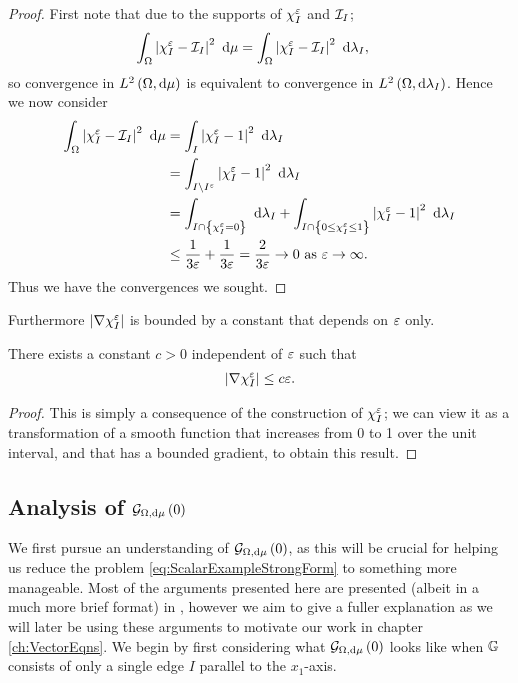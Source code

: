 \begin{proof}
	First note that due to the supports of $\chi_I^\varepsilon$ and $\mathcal{I}_{I}$;
	\begin{align*}
		\int_{\Omega}\left\lvert  \chi_I^\varepsilon - \mathcal{I}_{I}  \right\rvert^2 \ \mathrm{d}\mu
		&= \int_{\Omega}\left\lvert  \chi_I^\varepsilon - \mathcal{I}_{I}  \right\rvert^2 \ \mathrm{d}\lambda_I,
	\end{align*}
	so convergence in $L^{2}\left( \Omega,\mathrm{d}\mu \right)$ is equivalent to convergence in $L^{2}\left( \Omega,\mathrm{d}\lambda_I \right)$.
	Hence we now consider
	\begin{align*}
		\int_{\Omega}\left\lvert  \chi_I^\varepsilon - \mathcal{I}_{I}  \right\rvert^2 \ \mathrm{d}\mu
		&= \int_{I}\left\lvert  \chi_I^\varepsilon - 1  \right\rvert^2 \ \mathrm{d}\lambda_I \\
		&= \int_{I\setminus I^\varepsilon}\left\lvert  \chi_I^\varepsilon - 1  \right\rvert^2 \ \mathrm{d}\lambda_I \\
		&= \int_{I\cap\left\{ \chi_I^\varepsilon = 0 \right\}} \ \mathrm{d}\lambda_I
		+ \int_{I\cap\left\{ 0\leq\chi_I^\varepsilon \leq 1 \right\}}\left\lvert  \chi_I^\varepsilon - 1  \right\rvert^2 \ \mathrm{d}\lambda_I \\
		&\leq \frac{1}{3\varepsilon} + \frac{1}{3\varepsilon} = \frac{2}{3\varepsilon} \rightarrow 0 \ \text{as} \ \varepsilon \rightarrow\infty.
	\end{align*}
	Thus we have the convergences we sought.
\end{proof}
Furthermore $\left\lvert \nabla\chi_I^\varepsilon \right\rvert$ is bounded by a constant that depends on $\varepsilon$ only.
\begin{cory} \label{cory:BoundChiGradient}
	There exists a constant $c>0$ independent of $\varepsilon$ such that
	\begin{align*}
		\left\lvert \nabla\chi_I^\varepsilon \right\rvert \leq c\varepsilon.
	\end{align*}
\end{cory}
\begin{proof}
	This is simply a consequence of the construction of $\chi_I^\varepsilon$; we can view it as a transformation of a smooth function that increases from 0 to 1 over the unit interval, and that has a bounded gradient, to obtain this result.
\end{proof}

\subsection{Analysis of $\mathcal{G}_{ \Omega, \mathrm{d}\mu}\left( 0 \right)$} \label{sec:GradZeroGraphAnalysis}
We first pursue an understanding of $\mathcal{G}_{ \Omega, \mathrm{d}\mu}\left( 0 \right)$, as this will be crucial for helping us reduce the problem \eqref{eq:ScalarExampleStrongForm} to something more manageable.
Most of the arguments presented here are presented (albeit in a much more brief format) in \cite{zhikov2000extension}, however we aim to give a fuller explanation as we will later be using these arguments to motivate our work in chapter \ref{ch:VectorEqns}.
We begin by first considering what $\mathcal{G}_{ \Omega, \mathrm{d}\mu}\left( 0 \right)$ looks like when $\mathbb{G}$ consists of only a single edge $I$ parallel to the $x_1$-axis.

